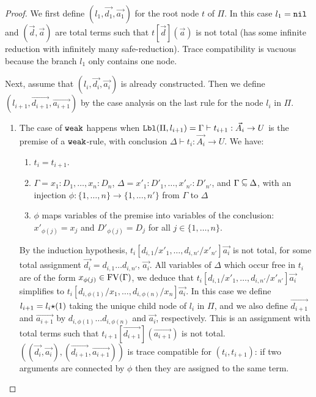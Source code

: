 \begin{proof}
  We first define $(l_1,\vec{d_1},\vec{a_1})$ for the root node $t$ of $\Pi$.
  In this case $l_1 = {\tt nil}$ 
   and $(\vec{d},\vec{a})$ are total terms such that $t[\vec{d}](\vec{a})$ is not total
   (has some infinite reduction with infinitely many safe-reduction).
  Trace compatibility is vacuous because the branch $l_1$ only contains one node.

  Next, assume that $(l_i,\vec{d_i},\vec{a_i})$ is already constructed.
  Then we define $(l_{i+1},\vec{d_{i+1}},\vec{a_{i+1}})$ by the case analysis on
  the last rule for the node $l_i$ in $\Pi$. 
\begin{enumerate}
\item
  The case of ${\tt weak}$ happens when
  ${\tt Lbl}(\Pi,l_{i+1}) = \Gamma \vdash t_{i+1}:\vec{A_i}\rightarrow U$
  is the premise of a ${\tt weak}$-rule, with conclusion
  $\Delta \vdash t_{i}:\vec{A_i}\rightarrow U$. We have:
\begin{enumerate}
\item
 $t_i = t_{i+1}$. 
\item
  $\Gamma = x_1:D_1,\ldots,x_n:D_n$, $\Delta= x'_1:D'_1,\ldots,x'_{n'}:D'_{n'}$, and 
  $\Gamma \subseteqsim \Delta$,
  with an injection $\phi:\{1,\ldots,n\}\to\{1,\ldots,n'\}$ from $\Gamma$ to $\Delta$
\item
  $\phi$ maps variables of the premise into variables of the conclusion:
   $x'_{\phi(j)} = x_j$ and $D'_{\phi(j)} = D_j$ for all $j \in \{1,\ldots,n\}$.
\end{enumerate}

  By the induction hypothesis, 
  $t_i[d_{i,1}/x'_1,\ldots,d_{i,{n'}}/x'_{n'}]\vec{a_i}$ is not total,
  for some total assignment $\vec{d_i} = d_{i,1}\ldots d_{i,{n'}}$, $\vec{a_i}$.
  All variables of $\Delta$ which occur free in $t_i$ are of the form 
  $x_{\phi(j)} \in {{\rm FV}}(\Gamma)$, we deduce that
  $
   t_i[d_{i,1}/x'_1,\ldots,d_{i,{n'}}/x'_{n'}]\vec{a_i}
  $
  simplifies to
  $
   t_i[d_{i,\phi(1)}/x_1,\ldots,d_{i,\phi(n)}/x_n]\vec{a_i} 
  $.
  In this case 
  we define $l_{i+1} = l_i{\star}(1)$ taking the unique child node of $l_i$ in $\Pi$, and we
  also define $\vec{d_{i+1}}$ and $\vec{a_{i+1}}$ by $d_{i,\phi(1)}\ldots d_{i,\phi(n)}$
  and $\vec{a_i}$, respectively. This is an assignment with total terms such that
  $t_{i+1}[\vec{d_{i+1}}](\vec{a_{i+1}})$ is not total.
  $((\vec{d_i},\vec{a_i}),(\vec{d_{i+1}},\vec{a_{i+1}}))$
  is trace compatible for $(t_i,t_{i+1})$: if two arguments are connected 
  by $\phi$ then they are assigned to the same term. 


\end{enumerate}
\end{proof}
